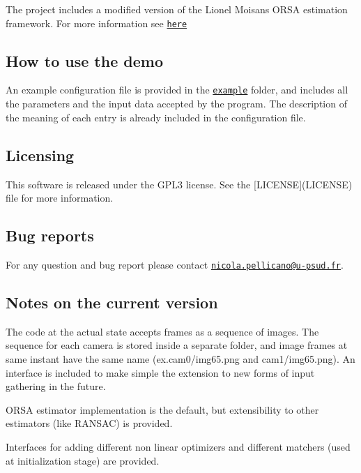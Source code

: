 The project includes a modified version of the Lionel Moisan\textquotesingle{}s O\+R\+S\+A estimation framework. For more information see \href{http://www.ipol.im/pub/art/2016/147/}{\tt here}

\subsection*{How to use the demo}

An example configuration file is provided in the \href{src/example}{\tt example} folder, and includes all the parameters and the input data accepted by the program. The description of the meaning of each entry is already included in the configuration file.

\subsection*{Licensing}

This software is released under the G\+P\+L3 license. See the \mbox{[}L\+I\+C\+E\+N\+S\+E\mbox{]}(L\+I\+C\+E\+N\+S\+E) file for more information.

\subsection*{Bug reports}

For any question and bug report please contact \href{mailto:nicola.pellicano@u-psud.fr}{\tt nicola.\+pellicano@u-\/psud.\+fr}.

\subsection*{Notes on the current version}


\begin{DoxyItemize}
\item The code at the actual state accepts frames as a sequence of images. The sequence for each camera is stored inside a separate folder, and image frames at same instant have the same name (ex.\+cam0/img65.png and cam1/img65.\+png). An interface is included to make simple the extension to new forms of input gathering in the future.
\item O\+R\+S\+A estimator implementation is the default, but extensibility to other estimators (like R\+A\+N\+S\+A\+C) is provided.
\item Interfaces for adding different non linear optimizers and different matchers (used at initialization stage) are provided. 
\end{DoxyItemize}